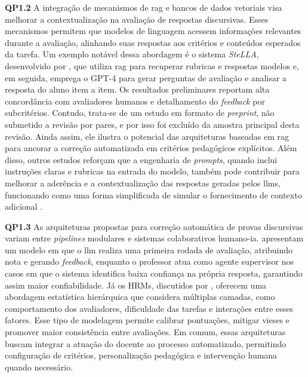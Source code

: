 \textbf{QP1.2}
A integração de mecanismos de \gls{rag} e bancos de dados vetoriais visa melhorar a contextualização na avaliação de respostas discursivas. Esses mecanismos permitem que modelos de linguagem acessem informações relevantes durante a avaliação, alinhando suas respostas aos critérios e conteúdos esperados da tarefa. Um exemplo notável dessa abordagem é o sistema \textit{SteLLA}, desenvolvido por , que utiliza \gls{rag} para recuperar rubricas e respostas modelos e, em seguida, emprega o GPT-4 para gerar perguntas de avaliação e analisar a resposta do aluno item a item. Os resultados preliminares reportam alta concordância com avaliadores humanos e detalhamento do \textit{feedback} por subcritérios. Contudo, trata-se de um estudo em formato de \textit{preprint}, não submetido a revisão por pares, e por isso foi excluído da amostra principal desta revisão. Ainda assim, ele ilustra o potencial das arquiteturas baseadas em \gls{rag} para ancorar a correção automatizada em critérios pedagógicos explícitos. Além disso, outros estudos reforçam que a engenharia de \textit{prompts}, quando inclui instruções claras e rubricas na entrada do modelo, também pode contribuir para melhorar a aderência e a contextualização das respostas geradas pelos \gls{llm}s, funcionando como uma forma simplificada de simular o fornecimento de contexto adicional \cite{hutt_feedback_2024}. 

\textbf{QP1.3}
As arquiteturas propostas para correção automática de provas discursivas variam entre \textit{pipelines} modulares e sistemas colaborativos humano-\gls{ia}.  apresentam um modelo em que o \gls{llm} realiza uma primeira rodada de avaliação, atribuindo nota e gerando \textit{feedback}, enquanto o professor atua como agente supervisor nos casos em que o sistema identifica baixa confiança na própria resposta, garantindo assim maior confiabilidade. Já os HRMs, discutidos por , oferecem uma abordagem estatística hierárquica que considera múltiplas camadas, como comportamento dos avaliadores, dificuldade das tarefas e interações entre esses fatores. Esse tipo de modelagem permite calibrar pontuações, mitigar vieses e promover maior consistência entre avaliações. Em comum, essas arquiteturas buscam integrar a atuação do docente ao processo automatizado, permitindo configuração de critérios, personalização pedagógica e intervenção humana quando necessário.


